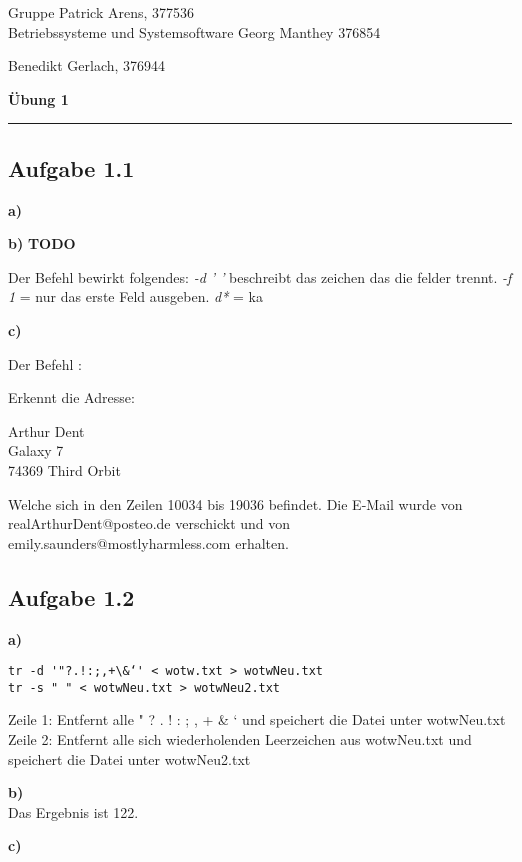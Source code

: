 \documentclass[a4paper,graphics,11pt]{article}
\newcommand{\aufgabe}[1]{\subsection*{Aufgabe #1}}
\begin{document}
\noindent Gruppe              \hfill Patrick Arens, 377536\\
\noindent Betriebssysteme und Systemsoftware    \hfill Georg Manthey 376854\\
\strut\hfill Benedikt Gerlach, 376944\\
\begin{center}
	\LARGE{\textbf{Übung 1}}
\end{center}
\begin{center}
\rule[0.1ex]{\textwidth}{1pt}
\end{center}

\aufgabe{1.1}
\textbf{a)}



\textbf{b)}
\textbf{TODO}

Der Befehl bewirkt folgendes: \textit{-d ’ ’} beschreibt das zeichen das die felder trennt. \textit{-f 1} = nur das erste Feld ausgeben. \textit{d*} = ka

\textbf{c)}

Der Befehl :



Erkennt die Adresse:

Arthur Dent\\
Galaxy 7\\
74369 Third Orbit

Welche sich in den Zeilen 10034 bis 19036 befindet. Die E-Mail wurde von realArthurDent@posteo.de verschickt und von emily.saunders@mostlyharmless.com erhalten.\\

\aufgabe{1.2}
\textbf{a)}

\begin{verbatim}
tr -d '"?.!:;,+\&‘' < wotw.txt > wotwNeu.txt
tr -s " " < wotwNeu.txt > wotwNeu2.txt
\end{verbatim}

Zeile 1: Entfernt alle " ? . ! : ; , +  \& ‘  und speichert die Datei unter wotwNeu.txt\\
Zeile 2: Entfernt alle sich wiederholenden Leerzeichen aus wotwNeu.txt und speichert die Datei unter wotwNeu2.txt\\

\newpage

\textbf{b)}\\



Das Ergebnis ist 122.

\textbf{c)}\\
\end{document}

